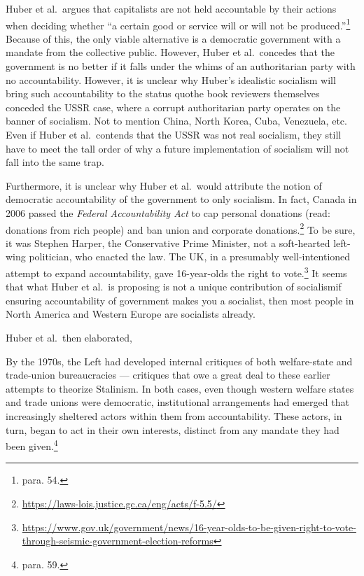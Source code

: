 \documentclass[12pt]{article}
\begin{document}
Huber et al.\ argues that capitalists are not held accountable by their actions when deciding whether ``a certain good or service will or will not be produced.''\footnote{para. 54.} Because of this, the only viable alternative is a democratic government with a mandate from the collective public. However, Huber et al.\ concedes that the government is no better if it falls under the whims of an authoritarian party with no accountability. However, it is unclear why Huber's idealistic socialism will bring such accountability to the status quo\textemdash{}the book reviewers themselves conceded the USSR case, where a corrupt authoritarian party operates on the banner of socialism. Not to mention China, North Korea, Cuba, Venezuela, etc. Even if Huber et al.\ contends that the USSR was not real socialism, they still have to meet the tall order of why a future implementation of socialism will not fall into the same trap.

Furthermore, it is unclear why Huber et al.\ would attribute the notion of democratic accountability of the government to only socialism. In fact, Canada in 2006 passed the \textit{Federal Accountability Act} to cap personal donations (read: donations from rich people) and ban union and corporate donations.\footnote{\href{https://laws-lois.justice.gc.ca/eng/acts/f-5.5/}{https://laws-lois.justice.gc.ca/eng/acts/f-5.5/}} To be sure, it was Stephen Harper, the Conservative Prime Minister, not a soft-hearted left-wing politician, who enacted the law. The UK, in a presumably well-intentioned attempt to expand accountability, gave 16-year-olds the right to vote.\footnote{\href{https://www.gov.uk/government/news/16-year-olds-to-be-given-right-to-vote-through-seismic-government-election-reforms}{https://www.gov.uk/government/news/16-year-olds-to-be-given-right-to-vote-through-seismic-government-election-reforms}} It seems that what Huber et al.\ is proposing is not a unique contribution of socialism\textemdash{}if ensuring accountability of government makes you a socialist, then most people in North America and Western Europe are socialists already.

Huber et al.\ then elaborated,

	By the 1970s, the Left had developed internal critiques of both welfare-state and trade-union bureaucracies — critiques that owe a great deal to these earlier attempts to theorize Stalinism. In both cases, even though western welfare states and trade unions were democratic, institutional arrangements had emerged that increasingly sheltered actors within them from accountability. These actors, in turn, began to act in their own interests, distinct from any mandate they had been given.\footnote{para. 59.}
\end{document}
